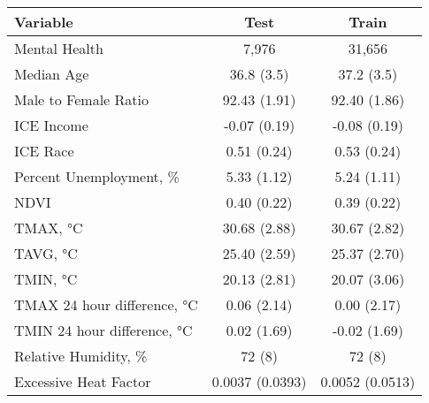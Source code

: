 \begin{longtable}{lcc}
\toprule
\textbf{Variable} & \textbf{Test} & \textbf{Train} \\ 
\midrule
Mental Health & 7,976 & 31,656 \\ 
Median Age & 36.8 (3.5) & 37.2 (3.5) \\ 
Male to Female Ratio & 92.43 (1.91) & 92.40 (1.86) \\ 
ICE Income & -0.07 (0.19) & -0.08 (0.19) \\ 
ICE Race & 0.51 (0.24) & 0.53 (0.24) \\ 
Percent Unemployment, \% & 5.33 (1.12) & 5.24 (1.11) \\ 
NDVI & 0.40 (0.22) & 0.39 (0.22) \\ 
TMAX, °C & 30.68 (2.88) & 30.67 (2.82) \\ 
TAVG, °C & 25.40 (2.59) & 25.37 (2.70) \\ 
TMIN, °C & 20.13 (2.81) & 20.07 (3.06) \\ 
TMAX 24 hour difference, °C & 0.06 (2.14) & 0.00 (2.17) \\ 
TMIN 24 hour difference, °C & 0.02 (1.69) & -0.02 (1.69) \\ 
Relative Humidity, \% & 72 (8) & 72 (8) \\ 
Excessive Heat Factor & 0.0037 (0.0393) & 0.0052 (0.0513) \\ 
\bottomrule
\end{longtable}

